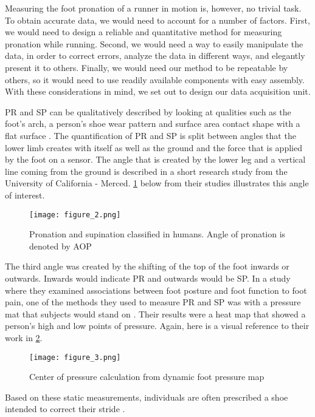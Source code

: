 Measuring the foot pronation of a runner in motion is, however, no trivial task.
To obtain accurate data, we would need to account for a number of factors.
First, we would need to design a reliable and quantitative method for measuring pronation while running.
Second, we would need a way to easily manipulate the data, in order to correct errors, analyze the data in different ways, and elegantly present it to others.
Finally, we would need our method to be repeatable by others, so it would need to use readily available components with easy assembly.
With these considerations in mind, we set out to design our data acquisition unit.\par
PR and SP can be qualitatively described by looking at qualities such as the foot’s arch, a person's shoe wear pattern and surface area contact shape with a flat surface \parencite{erickson}.
The quantification of PR and SP is split between angles that the lower limb creates with itself as well as the ground and the force that is applied by the foot on a sensor.
The angle that is created by the lower leg and a vertical line coming from the ground is described in a short research study from the University of California - Merced.
\ref{fig:x AOP} below from their studies illustrates this angle of interest.\par
\begin{figure}
  \centering
  \texttt{[image: figure\_2.png]}
  \caption[Pronation angle]{Pronation and supination classified in humans. Angle of pronation is denoted by AOP \parencite{erickson}}
  \label{fig:x AOP}
\end{figure}
The third angle was created by the shifting of the top of the foot inwards or outwards.
Inwards would indicate PR and outwards would be SP. In a study where they examined associations between foot posture and foot function to foot pain, one of the methods they used to measure PR and SP was with a pressure mat that subjects would stand on \parencite{menz}.
Their results were a heat map that showed a person's high and low points of pressure. Again, here is a visual reference to their work in \ref{fig:x press. map}.\par
\begin{figure}
  \centering
  \texttt{[image: figure\_3.png]}
  \caption[Foot pressure map]{Center of pressure calculation from dynamic foot pressure map \parencite{menz}}
  \label{fig:x press. map}
\end{figure}
Based on these static measurements, individuals are often prescribed a shoe intended to correct their stride \parencite{neumann}.
